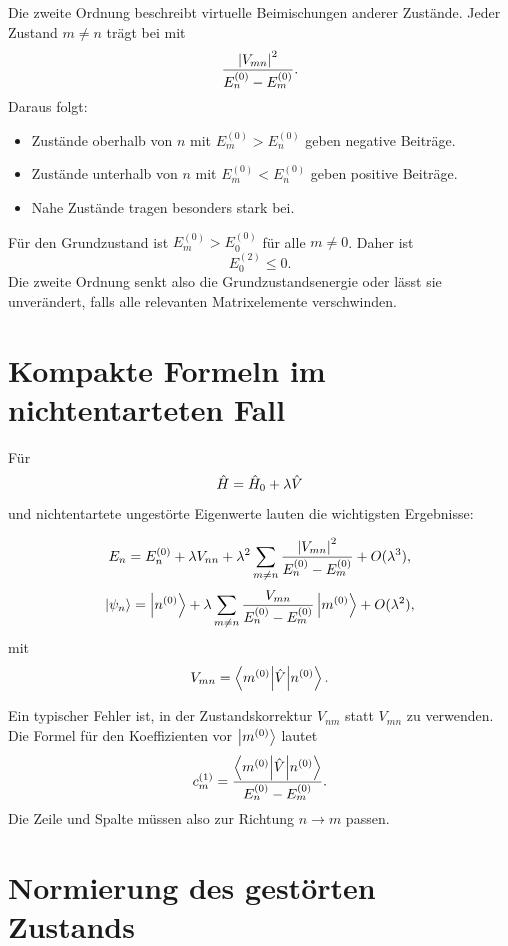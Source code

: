 Die zweite Ordnung beschreibt virtuelle Beimischungen anderer Zustände. Jeder Zustand \(m\neq n\) trägt bei mit
\[
    \frac{\left| V_{mn} \right|^2}{E_n^{(0)}-E_m^{(0)}}.
\]
Daraus folgt:
\begin{itemize}
    \item Zustände oberhalb von \(n\) mit \(E_m^{(0)}>E_n^{(0)}\) geben negative Beiträge.
    \item Zustände unterhalb von \(n\) mit \(E_m^{(0)}<E_n^{(0)}\) geben positive Beiträge.
    \item Nahe Zustände tragen besonders stark bei.
\end{itemize}

\begin{notebox}
Für den Grundzustand ist \(E_m^{(0)}>E_0^{(0)}\) für alle \(m\neq 0\). Daher ist
\[
    E_0^{(2)}\leq 0.
\]
Die zweite Ordnung senkt also die Grundzustandsenergie oder lässt sie unverändert, falls alle relevanten Matrixelemente verschwinden.
\end{notebox}

\section{Kompakte Formeln im nichtentarteten Fall}

Für
\[
    \hat H=\hat H_0+\lambda\hat V
\]
und nichtentartete ungestörte Eigenwerte lauten die wichtigsten Ergebnisse:

\begin{formulabox}
\[
    E_n
    =E_n^{(0)}
    +\lambda V_{nn}
    +\lambda^2\sum_{m\neq n}\frac{\left| V_{mn} \right|^2}{E_n^{(0)}-E_m^{(0)}}
    +O(\lambda^3),
\]
\[
    \left|\psi_n\right\rangle
    =\left|n^{(0)}\right\rangle
    +\lambda\sum_{m\neq n}\frac{V_{mn}}{E_n^{(0)}-E_m^{(0)}}\left|m^{(0)}\right\rangle
    +O(\lambda^2),
\]
mit
\[
    V_{mn}=\left\langle m^{(0)}\middle|\hat V\middle|n^{(0)}\right\rangle.
\]
\end{formulabox}

\begin{examtipbox}
Ein typischer Fehler ist, in der Zustandskorrektur \(V_{nm}\) statt \(V_{mn}\) zu verwenden. Die Formel für den Koeffizienten vor \(\left|m^{(0)}\right\rangle\) lautet
\[
    c_m^{(1)}=\frac{\left\langle m^{(0)}\middle|\hat V\middle|n^{(0)}\right\rangle}{E_n^{(0)}-E_m^{(0)}}.
\]
Die Zeile und Spalte müssen also zur Richtung \(n\to m\) passen.
\end{examtipbox}

\section{Normierung des gestörten Zustands}


